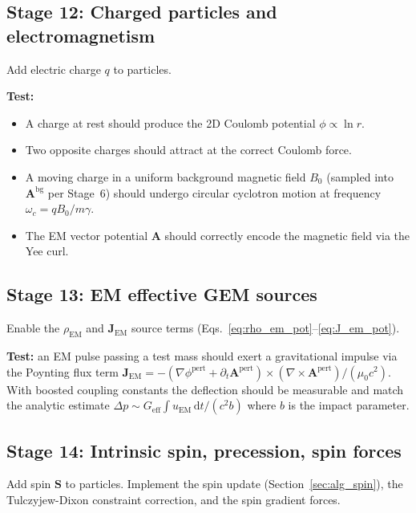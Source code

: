 \documentclass[11pt,a4paper]{article}
\newcommand{\vv}[1]{\mathbf{#1}}
\newcommand{\dd}{\mathrm{d}}
\begin{document}
\subsection{Stage 12: Charged particles and electromagnetism}

Add electric charge $q$ to particles.

\textbf{Test:}
\begin{itemize}
  \item A charge at rest should produce the 2D Coulomb potential $\phi \propto \ln r$.
  \item Two opposite charges should attract at the correct Coulomb force.
  \item A moving charge in a uniform background magnetic field $B_0$ (sampled into $\vv{A}^{\mathrm{bg}}$ per Stage~6) should undergo circular cyclotron motion at frequency $\omega_c = qB_0/m\gamma$.
  \item The EM vector potential $\vv{A}$ should correctly encode the magnetic field via the Yee curl.
\end{itemize}

\subsection{Stage 13: EM effective GEM sources}

Enable the $\rho_{\mathrm{EM}}$ and $\vv{J}_{\mathrm{EM}}$ source terms (Eqs.~\ref{eq:rho_em_pot}--\ref{eq:J_em_pot}).

\textbf{Test:} an EM pulse passing a test mass should exert a gravitational impulse via the Poynting flux term $\vv{J}_{\mathrm{EM}} = -(\nabla\phi^{\mathrm{pert}}+\partial_t\vv{A}^{\mathrm{pert}})\times(\nabla\times\vv{A}^{\mathrm{pert}})/(\mu_0 c^2)$.  With boosted coupling constants the deflection should be measurable and match the analytic estimate $\Delta p \sim G_{\mathrm{eff}}\int u_{\mathrm{EM}}\,\dd t / (c^2 b)$ where $b$ is the impact parameter.

\subsection{Stage 14: Intrinsic spin, precession, spin forces}

Add spin $\vv{S}$ to particles.  Implement the spin update (Section~\ref{sec:alg_spin}), the Tulczyjew-Dixon constraint correction, and the spin gradient forces.
\end{document}
